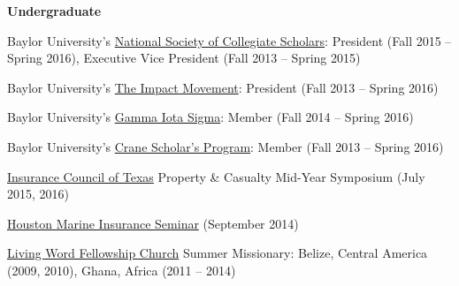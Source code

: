 \documentclass[10pt]{article}
\renewcommand{\section}[2]%
        {\pagebreak[2]\vspace{1.3\baselineskip}%
         \phantomsection\addcontentsline{toc}{section}{#1}%
         \hspace{0in}%
         \marginpar{
         \raggedright \scshape #1}#2}
\newenvironment{innerlist}[1][\enskip\textbullet]%
        {\begin{compactenum}[#1]}{\end{compactenum}}
\newcommand{\annotate}[1]{{\color{darkgreen}#1}}
\renewcommand{\annotate}[1]{\ } %
\newcommand{\pl}[1]{{\fontfamily{\sfdefault}\selectfont #1}}
\newcommand{\pkg}[1]{\textbf{#1}}
\begin{document}
\textbf{Undergraduate}
\begin{innerlist}
\item Baylor University's \href{https://baylor.campuslabs.com/engage/organization/national-society-of-collegiate-scholars/}{National Society of Collegiate Scholars}: President (Fall 2015 -- Spring 2016), Executive Vice President (Fall 2013 -- Spring 2015)
\item Baylor University's \href{https://baylor.campuslabs.com/engage/organization/the-impact-movement/}{The Impact Movement}: President (Fall 2013 -- Spring 2016)
\item Baylor University's \href{https://blogs.baylor.edu/rmi/gamma-iota-sigma/}{Gamma Iota Sigma}: Member (Fall 2014 -- Spring 2016)
\item Baylor University's \href{https://www.baylor.edu/ifl/index.php?id=934992/}{Crane Scholar's Program}: Member (Fall 2013 -- Spring 2016)
\item \href{https://www.insurancecouncil.org/}{Insurance Council of Texas} Property \& Casualty Mid-Year Symposium (July 2015, 2016)
\item \href{https://houstonmeic.com/}{Houston Marine Insurance Seminar} (September 2014)
\item \href{https://www.lwfellowshipchurch.org/}{Living Word Fellowship Church} Summer Missionary: Belize, Central America (2009, 2010), Ghana, Africa (2011 -- 2014)
\end{innerlist}












%
%
%
%
\end{document}
